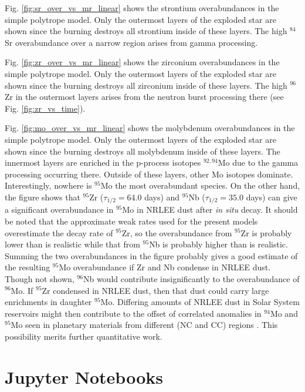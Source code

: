\documentclass[preprint]{revtex4-2}
\begin{document}
Fig. \ref{fig:sr_over_vs_mr_linear} shows the strontium overabundances
in the simple polytrope model.
Only the outermost layers of the exploded star are shown
since the burning destroys all strontium inside of these layers.  The high
$^{84}$Sr overabundance over a narrow region arises from gamma processing.

Fig. \ref{fig:zr_over_vs_mr_linear} shows the zirconium overabundances
in the simple polytrope model.
Only the outermost layers of the exploded star are shown
since the burning destroys all zirconium inside of these layers.  The
high $^{96}$Zr in the outermost layers
arises from the neutron burst processing there
(see Fig. \ref{fig:zr_vs_time}).

Fig. \ref{fig:mo_over_vs_mr_linear} shows the molybdenum overabundances
in the simple polytrope model.
Only the outermost layers of the exploded star are shown
since the burning destroys all molybdenum inside of these layers.
The innermost layers are enriched in the p-process isotopes $^{92,94}$Mo
due to the gamma processing occurring there.  Outside of these layers,
other Mo isotopes dominate.  Interestingly, nowhere is $^{95}$Mo the most
overabundant species.  On the other hand, the figure shows that
$^{95}$Zr ($\tau_{1/2} = 64.0$ days) and $^{95}$Nb ($\tau_{1/2} = 35.0$ days)
can give a significant overabundance
in $^{95}$Mo in NRLEE dust after {\it in situ} decay.  It should be
noted that the approximate weak rates used for the present models
\cite{2010A&A...522A..25A}
overestimate the decay rate of $^{95}$Zr, so the overabundance from
$^{95}$Zr is probably lower than is realistic while that from
$^{95}$Nb is probably higher than is realistic.  Summing the two overabundances
in the figure probably gives a good estimate of the resulting $^{95}$Mo
overabundance if Zr and Nb condense in NRLEE dust.
Though not shown, $^{96}$Nb would contribute insignificantly to the 
overabundance of $^{96}$Mo.
If $^{95}$Zr condensed in NRLEE dust, then that dust could carry large
enrichments in daughter $^{95}$Mo.  Differing amounts of NRLEE dust in
Solar System reservoirs might then contribute to the offset
of correlated anomalies in $^{94}$Mo and $^{95}$Mo
seen in planetary materials from different (NC and
CC) regions \cite{2019NatAs...3..736B}.
This possibility merits further quantitative work.

\section{Jupyter Notebooks} \label{sec:jupyter}
\end{document}
